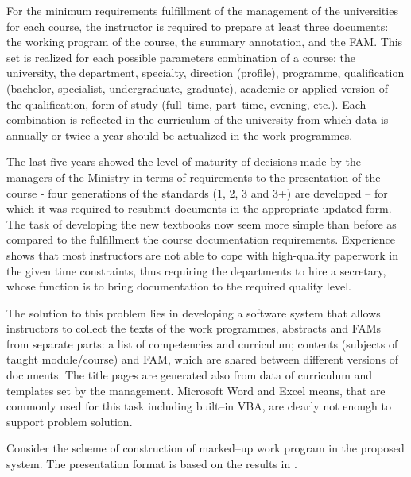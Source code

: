 \documentclass[conference,a4paper]{IEEEtran}
\begin{document}
For the minimum requirements fulfillment of the management of the
universities for each course, the instructor is required to prepare at
least three documents: the working program of the course, the summary
annotation, and the FAM. This set is realized for each possible
parameters combination of a course: the university, the department,
specialty, direction (profile), programme, qualification (bachelor,
specialist, undergraduate, graduate), academic or applied version of the
qualification, form of study (full--time, part--time, evening, etc.). Each
combination is reflected in the curriculum of the university from which
data is annually or twice a year should be actualized in the work
programmes.

The last five years showed the level of maturity of decisions made by
the managers of the Ministry in terms of requirements to the
presentation of the course - four generations of the standards (1, 2, 3
and 3+) are developed -- for which it was required to resubmit documents
in the appropriate updated form. The task of developing the new
textbooks now seem more simple than before as compared to the
fulfillment the course documentation requirements. Experience shows that
most instructors are not able to cope with high-quality paperwork in the
given time constraints, thus requiring the departments to hire a
secretary, whose function is to bring documentation to the required
quality level.

The solution to this problem lies in developing a software system that
allows instructors to collect the texts of the work programmes,
abstracts and FAMs from separate parts: a list of competencies and
curriculum; contents (subjects of taught module/course) and FAM, which
are shared between different versions of documents. The title pages are
generated also from data of curriculum and templates set by the
management. Microsoft Word and Excel means, that are commonly used for
this task including built--in VBA, are clearly not enough to support
problem solution.

Consider the scheme of construction of marked--up work program in the
proposed system. The presentation format is based on the results in
\cite{b4,b15}.
\end{document}

